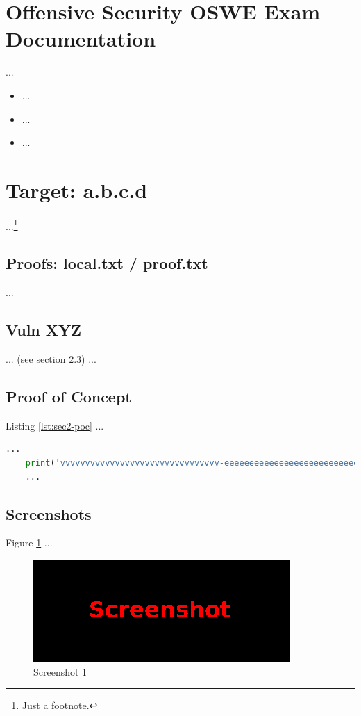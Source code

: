 %
%
%
\section{Offensive Security OSWE Exam Documentation}\label{sec:sec1}
%
...

\begin{itemize}
    \item ...
    \item ...
    \item ...
\end{itemize}
%
%
%
\section{Target: a.b.c.d}\label{sec:sec2}
%
...\footnote{Just a footnote.}
%
%
%
\subsection{Proofs: local.txt / proof.txt}\label{sec:sec2-proofs}
%
...
%
%
%
\subsection{Vuln XYZ}\label{sec:sec2-vuln}
%
... (see section \ref{sec:sec2-poc}) ...

%
%
%
\subsection{Proof of Concept}\label{sec:sec2-poc}
Listing \ref{lst:sec2-poc} ...\\

\begin{lstlisting}[language=Python,caption={Proof of Concept}, label={lst:sec2-poc}]
    ...
    print('vvvvvvvvvvvvvvvvvvvvvvvvvvvvvvvv-eeeeeeeeeeeeeeeeeeeeeeeeeeeeeeeeeeeeeeeeeee-looooooooooooooooooooooong-striiiiiiiiiiiiiing')
    ...
\end{lstlisting}
%
%
%
\subsection{Screenshots}\label{sec:sec2-screen1}
%
Figure \ref{fig:sec2-screen1} ...

\begin{figure}[H]
    \centering
    \includegraphics[width=\textwidth]{img/assignment1/screen1.png}
    \caption{Screenshot 1}\label{fig:sec2-screen1}
\end{figure}
%
%
%
